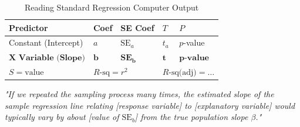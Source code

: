 \begin{table}[H]
\centering
\small
\begin{tabular}{@{}lllll@{}}
\toprule
\textbf{Predictor} & \textbf{Coef} & \textbf{SE Coef} & \textbf{$T$} & \textbf{$P$} \\
\midrule
Constant (Intercept) & $a$ & $\text{SE}_a$ & $t_a$ & $p$-value \\
$\mathbf{X \text{ Variable (Slope)}}$ & $\mathbf{b}$ & $\mathbf{\text{SE}_b}$ & $\mathbf{t}$ & $\mathbf{p\text{-value}}$ \\
\midrule
$S = \text{value}$ & \multicolumn{2}{l}{$R\text{-sq} = r^2$} & \multicolumn{2}{l}{$R\text{-sq(adj)} = \dots$} \\
\bottomrule
\end{tabular}
\caption{Reading Standard Regression Computer Output}
\end{table}

\begin{templatebox}
\emph{"If we repeated the sampling process many times, the estimated slope of the sample regression line relating [response variable] to [explanatory variable] would typically vary by about [value of $\text{SE}_b$] from the true population slope $\beta$."}
\end{templatebox}
